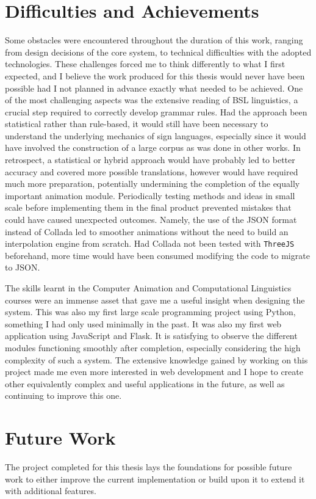 \documentclass[12pt]{ociamthesis}  %
\newcommand{\tech}{\texttt}
\begin{document}
\section{Difficulties and Achievements}
Some obstacles were encountered throughout the duration of this work, ranging from design decisions of the core system, to technical difficulties with the adopted technologies. These challenges forced me to think differently to what I first expected, and I believe the work produced for this thesis would never have been possible had I not planned in advance exactly what needed to be achieved. One of the most challenging aspects was the extensive reading of BSL linguistics, a crucial step required to correctly develop grammar rules. Had the approach been statistical rather than rule-based, it would still have been necessary to understand the underlying mechanics of sign languages, especially since it would have involved the construction of a large corpus as was done in other works. In retrospect, a statistical or hybrid approach would have probably led to better accuracy and covered more possible translations, however would have required much more preparation, potentially undermining the completion of the equally important animation module. Periodically testing methods and ideas in small scale before implementing them in the final product prevented mistakes that could have caused unexpected outcomes. Namely, the use of the JSON format instead of Collada led to smoother animations without the need to build an interpolation engine from scratch. Had Collada not been tested with \tech{ThreeJS} beforehand, more time would have been consumed modifying the code to migrate to JSON.

The skills learnt in the Computer Animation and Computational Linguistics courses were an immense asset that gave me a useful insight when designing the system. This was also my first large scale programming project using Python, something I had only used minimally in the past. It was also my first web application using JavaScript and Flask. It is satisfying to observe the different modules functioning smoothly after completion, especially considering the high complexity of such a system. The extensive knowledge gained by working on this project made me even more interested in web development and I hope to create other equivalently complex and useful applications in the future, as well as continuing to improve this one.

\section{Future Work}
\label{future work}
The project completed for this thesis lays the foundations for possible future work to either improve the current implementation or build upon it to extend it with additional features.
\end{document}
